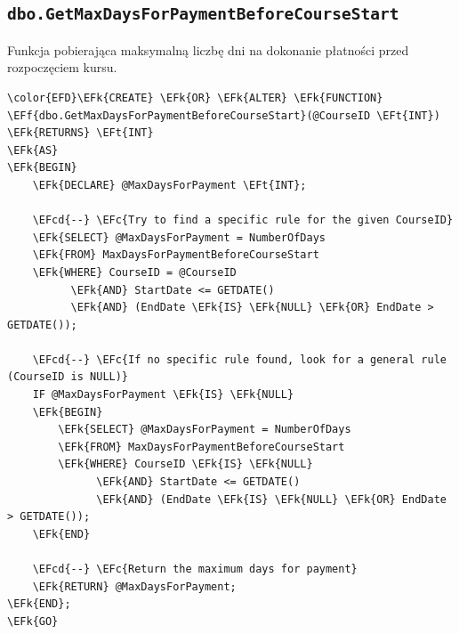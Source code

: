 \documentclass[11pt]{article}
\newcommand{\EFc}[1]{\textcolor{EFc}{\textit{#1}}} %
\newcommand{\EFcd}[1]{\textcolor{EFcd}{\textit{#1}}} %
\newcommand{\EFk}[1]{\textcolor{EFk}{\textbf{#1}}} %
\newcommand{\EFf}[1]{\textcolor{EFf}{#1}} %
\newcommand{\EFt}[1]{\textcolor{EFt}{\textbf{#1}}} %
\begin{document}
\subsection{\texttt{dbo.GetMaxDaysForPaymentBeforeCourseStart}}
\label{sec:org1b572eb}
Funkcja pobierająca maksymalną liczbę dni na dokonanie płatności przed rozpoczęciem kursu.
\begin{Code}
\begin{Verbatim}
\color{EFD}\EFk{CREATE} \EFk{OR} \EFk{ALTER} \EFk{FUNCTION} \EFf{dbo.GetMaxDaysForPaymentBeforeCourseStart}(@CourseID \EFt{INT})
\EFk{RETURNS} \EFt{INT}
\EFk{AS}
\EFk{BEGIN}
    \EFk{DECLARE} @MaxDaysForPayment \EFt{INT};

    \EFcd{--} \EFc{Try to find a specific rule for the given CourseID}
    \EFk{SELECT} @MaxDaysForPayment = NumberOfDays
    \EFk{FROM} MaxDaysForPaymentBeforeCourseStart
    \EFk{WHERE} CourseID = @CourseID
          \EFk{AND} StartDate <= GETDATE()
          \EFk{AND} (EndDate \EFk{IS} \EFk{NULL} \EFk{OR} EndDate > GETDATE());

    \EFcd{--} \EFc{If no specific rule found, look for a general rule (CourseID is NULL)}
    IF @MaxDaysForPayment \EFk{IS} \EFk{NULL}
    \EFk{BEGIN}
        \EFk{SELECT} @MaxDaysForPayment = NumberOfDays
        \EFk{FROM} MaxDaysForPaymentBeforeCourseStart
        \EFk{WHERE} CourseID \EFk{IS} \EFk{NULL}
              \EFk{AND} StartDate <= GETDATE()
              \EFk{AND} (EndDate \EFk{IS} \EFk{NULL} \EFk{OR} EndDate > GETDATE());
    \EFk{END}

    \EFcd{--} \EFc{Return the maximum days for payment}
    \EFk{RETURN} @MaxDaysForPayment;
\EFk{END};
\EFk{GO}
\end{Verbatim}
\end{Code}
\end{document}
